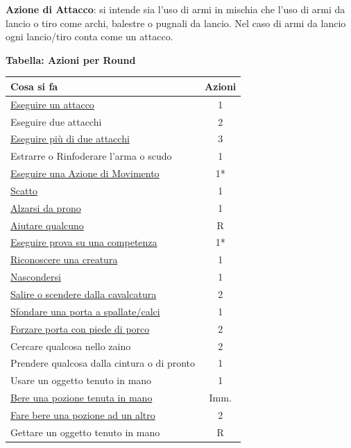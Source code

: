\begin{multicols}{2}
\textbf{Azione di Attacco}: si intende sia l'uso di armi in mischia che l'uso di armi da lancio o tiro come archi, balestre o pugnali da lancio. Nel caso di armi da lancio ogni lancio/tiro conta come un attacco.

\textbf{Tabella: Azioni per Round}

\medskip

\noindent\begin{tabular}{lc}
\textbf{Cosa si fa} & \textbf{Azioni}\\
\toprule
\hyperlink{tiropercolpireedifesa}{Eseguire un attacco}& 1\\
Eseguire due attacchi& 2\\
\hyperlink{attacchimultiplimischia}{Eseguire più di due attacchi}& 3\\
Estrarre o Rinfoderare l'arma o scudo& 1\\
\midrule
\hyperlink{tipodimovimento}{Eseguire una Azione di Movimento} &1*\\
\hyperlink{azionediscatto}{Scatto} & 1\\
\hyperlink{alzarsidaprono}{Alzarsi da prono}& 1\\
\midrule
\hyperlink{aiutare}{Aiutare qualcuno}& R\\
\hyperlink{esempiprovecompetenze}{Eseguire prova su una competenza}& 1*\\
\hyperlink{riconosceremostro}{Riconoscere una creatura}& 1\\
\hyperlink{copertura}{Nascondersi}& 1\\
\midrule
\hyperlink{cavalcare}{Salire o scendere dalla cavalcatura}& 2\\
\hyperlink{sfondare}{Sfondare una porta a spallate/calci}& 1\\
\hyperlink{piedediporco}{Forzare porta con piede di porco}& 2\\
\midrule
Cercare qualcosa nello zaino& 2\\
{\small Prendere qualcosa dalla cintura o di pronto} & 1\\
Usare un oggetto tenuto in mano& 1\\
\midrule
\hyperlink{insorgenzaveleno}{Bere una pozione tenuta in mano}& Imm.\\
\hyperlink{insorgenzaveleno}{Fare bere una pozione ad un altro} & 2\\
\midrule
Gettare un oggetto tenuto in mano& R\\

\end{tabular}
\end{multicols}

